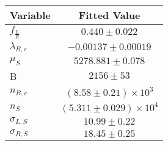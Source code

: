 \begin{tabular}[t]{lc}
\hline
Variable &Fitted Value\\
\hline\hline
$f_{\frac{L}{R}}$&$0.440\pm0.022$\\
\hline
$\lambda_{B,c}$&$-0.00137\pm0.00019$\\
\hline
$\mu_S$&$5278.881\pm0.078$\\
\hline
B&$2156\pm53$\\
\hline
$n_{B,c}$&$(8.58\pm0.21)\times 10^3$\\
\hline
$n_S$&$(5.311\pm0.029)\times 10^4$\\
\hline
$\sigma_{L, S}$&$10.99\pm0.22$\\
\hline
$\sigma_{R, S}$&$18.45\pm0.25$\\
\hline
\end{tabular}